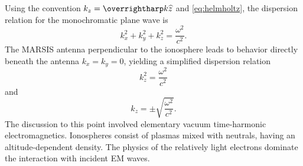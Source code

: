 Using the convention $k_z = \vect{k}\widehat{z}$ and \eqref{eq:helmholtz}, the dispersion relation for the monochromatic plane wave is
\begin{equation}\label{eq:planedisp}
k^2_x + k^2_y + k^2_z = \frac{\omega^2}{c^2}.
\end{equation}
The MARSIS antenna perpendicular to the ionosphere leads to behavior directly beneath the antenna $k_x = k_y = 0$, yielding a simplified dispersion relation
\begin{equation}
k_z^2 = \frac{\omega^2}{c^2}
\end{equation}
and 
\begin{equation}
k_z = \pm \sqrt{\frac{\omega^2}{c^2}}.
\end{equation}
The discussion to this point involved elementary vacuum time-harmonic electromagnetics.
Ionospheres consist of plasmas mixed with neutrals, having an altitude-dependent density.
The physics of the relatively light electrons dominate the interaction with incident EM waves.


